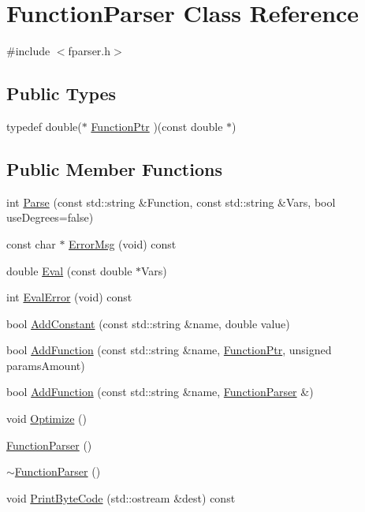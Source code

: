 \hypertarget{class_function_parser}{\section{Function\-Parser Class Reference}
\label{class_function_parser}
}


{\ttfamily \#include $<$fparser.\-h$>$}

\subsection*{Public Types}
\begin{DoxyCompactItemize}
\item 
typedef double($\ast$ \hyperlink{class_function_parser_aea1405edcb05ec80b5d0176c07aaf052}{Function\-Ptr} )(const double $\ast$)
\end{DoxyCompactItemize}
\subsection*{Public Member Functions}
\begin{DoxyCompactItemize}
\item 
int \hyperlink{class_function_parser_af4e0b209ec9771dcd76e27f3fcad1b51}{Parse} (const std\-::string \&Function, const std\-::string \&Vars, bool use\-Degrees=false)
\item 
const char $\ast$ \hyperlink{class_function_parser_a60c9d56cad01078c8e2f02ecd90b3050}{Error\-Msg} (void) const 
\item 
double \hyperlink{class_function_parser_a8fe3538f4cd207346c390059ba334023}{Eval} (const double $\ast$Vars)
\item 
int \hyperlink{class_function_parser_aaaa3542d38f764f3b9c440f2d7e13751}{Eval\-Error} (void) const 
\item 
bool \hyperlink{class_function_parser_a481976b6eb58b15d31d4f3700d9ad730}{Add\-Constant} (const std\-::string \&name, double value)
\item 
bool \hyperlink{class_function_parser_a8d477dd0041ca594dac795bba24c9f3a}{Add\-Function} (const std\-::string \&name, \hyperlink{class_function_parser_aea1405edcb05ec80b5d0176c07aaf052}{Function\-Ptr}, unsigned params\-Amount)
\item 
bool \hyperlink{class_function_parser_a7d6c6465658e9831d0c51e3bd6b5a4c0}{Add\-Function} (const std\-::string \&name, \hyperlink{class_function_parser}{Function\-Parser} \&)
\item 
void \hyperlink{class_function_parser_a5466523ee5198fb4b38461b362b1481d}{Optimize} ()
\item 
\hyperlink{class_function_parser_a18468eeb56ac5c1b1a6a0b0cebb2c045}{Function\-Parser} ()
\item 
\hyperlink{class_function_parser_a50257dda6ec4f2c4adf6740e31cf7da7}{$\sim$\-Function\-Parser} ()
\item 
void \hyperlink{class_function_parser_a7295bfa38eb25cd3111f0c30294232b9}{Print\-Byte\-Code} (std\-::ostream \&dest) const 
\end{DoxyCompactItemize}


